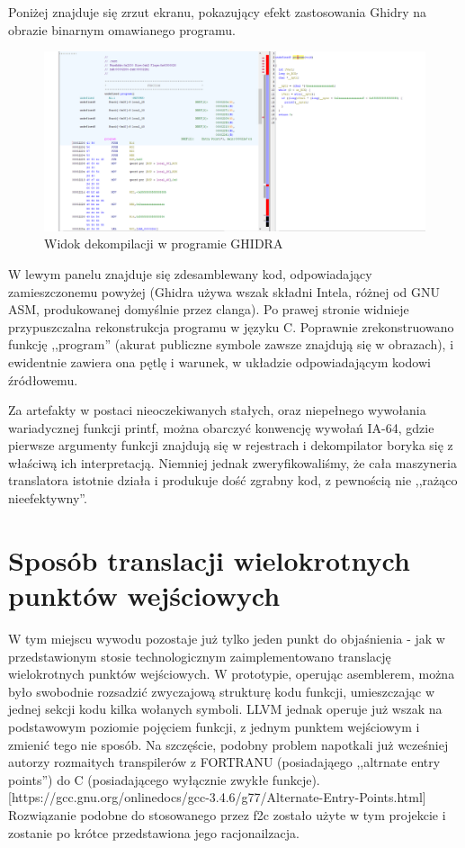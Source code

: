 Poniżej znajduje się zrzut ekranu, pokazujący efekt zastosowania Ghidry na obrazie binarnym omawianego programu.
\begin{figure}[h]
    \centering
    \includegraphics[width=1.3\textwidth]{images/1.progmain/ghidra1.png}
    \caption{Widok dekompilacji w programie GHIDRA}
\end{figure}

W lewym panelu znajduje się zdesamblewany kod, odpowiadający zamieszczonemu powyżej (Ghidra używa wszak składni Intela, różnej od GNU ASM, produkowanej domyślnie przez clanga). Po prawej stronie widnieje przypuszczalna rekonstrukcja programu w języku C. Poprawnie zrekonstruowano funkcję ,,program'' (akurat publiczne symbole zawsze znajdują się w obrazach), i ewidentnie zawiera ona pętlę i warunek, w układzie odpowiadającym kodowi źródłowemu. 

Za artefakty w postaci nieoczekiwanych stałych, oraz niepełnego wywołania wariadycznej funkcji printf, można obarczyć konwencję wywołań IA-64, gdzie pierwsze argumenty funkcji znajdują się w rejestrach i dekompilator boryka się z właściwą ich interpretacją.
Niemniej jednak zweryfikowaliśmy, że cała maszyneria translatora istotnie działa i produkuje dość zgrabny kod, z pewnością nie ,,rażąco nieefektywny''.

\section{Sposób translacji wielokrotnych punktów wejściowych}
W tym miejscu wywodu pozostaje już tylko jeden punkt do objaśnienia - jak w przedstawionym stosie technologicznym zaimplementowano translację wielokrotnych punktów wejściowych. W prototypie, operując asemblerem, można było swobodnie rozsadzić zwyczajową strukturę kodu funkcji, umieszczając w jednej sekcji kodu kilka wołanych symboli. LLVM jednak operuje już wszak na podstawowym poziomie pojęciem funkcji, z jednym punktem wejściowym i zmienić tego nie sposób. Na szczęście, podobny problem napotkali już wcześniej autorzy rozmaitych transpilerów z FORTRANU (posiadająego ,,altrnate entry points'') do C (posiadającego wyłącznie zwykłe funkcje).[https://gcc.gnu.org/onlinedocs/gcc-3.4.6/g77/Alternate-Entry-Points.html] Rozwiązanie podobne do stosowanego przez f2c zostało użyte w tym projekcie i zostanie po krótce przedstawiona jego racjonailzacja.

